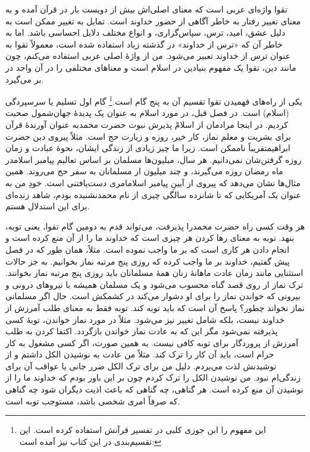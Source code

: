 تقوا واژه‌ای عربی است که معنای اصلی‌اش بیش از دویست بار در قرآن آمده و به معنای تغییر رفتار به خاطر آگاهی از حضور خداوند است. تمایل به تغییر ممکن است به دلیل عشق، امید، ترس، سپاس‌گزاری، و انواع مختلف دلایل احساسی باشد. اما به خاطر آن که «ترس از خداوند» در گذشته زیاد استفاده شده است، معمولاً تقوا به عنوان ترس از خداوند تعبیر می‌شود. من از واژهٔ اصلی عربی استفاده می‌کنم، چون مانند دین، تقوا یک مفهوم بنیادین در اسلام است و معناهای مختلفی را در آن واحد در بر می‌گیرد.

یکی از راه‌های فهمیدن تقوا تقسیم آن به پنج گام است.\footnote{این مفهوم را ابن جوزی کلبی در تفسیر قرآنش استفاده کرده است. این تقسیم‌بندی در این کتاب نیز آمده است:
	
	}
گام اول تسلیم یا سرسپردگی (اسلام) است. در فصل قبل، در مورد اسلام به عنوان یک پدیدهٔ جهان‌شمول صحبت کردیم. در اینجا مرادمان از اسلامْ پذیرش نبوت حضرت محمد{}به عنوان آورندهٔ قرآن برای بشریت و معلم نماز، کار خیر، روزه و زیارت حج است. مثلاً پیروی دین حضرت ابراهیم{}تقریباً ناممکن است. زیرا ما چیز زیادی از زندگی ایشان، نحوهٔ عبادت و زمان روزه گرفتن‌شان نمی‌دانیم. هر سال، میلیون‌ها مسلمان بر اساس تعالیم پیامبر اسلام{}در ماه رمضان روزه می‌گیرند، و چند میلیون از مسلمانان به سفر حج می‌روند. همین مثال‌ها نشان می‌دهد که پیروی از آیینِ پیامبر اسلام{}امری دست‌یافتنی است. خودِ من به عنوان یک آمریکایی که تا شانزده سالگی چیزی از نام محمد{}نشنیده بودم، شاهد زنده‌ای برای این استدلال هستم.

هر وقت کسی راه حضرت محمد{}را پذیرفت، می‌تواند قدم به دومین گام تقوا، یعنی توبه، بنهد. توبه به معنای رها کردن هر چیزی است که خداوند ما را از آن منع کرده است و انجام دادن هر کاری است که بر ما واجب نموده است. مثلاً، همان طور که در فصل پیش گفتیم، خداوند بر ما واجب کرده که روزی پنج مرتبه نماز بخوانیم. به جز حالات استثنایی مانند زمان عادت ماهانهٔ زنان همهٔ مسلمانان باید روزی پنج مرتبه نماز بخوانند. ترک نماز از روی قصد گناه محسوب می‌شود و یک مسلمان همیشه با نیروهای درونی و بیرونی که خواندن نماز را برای او دشوار می‌کند در کشمکش است. حال اگر مسلمانی نماز نخواند چطور؟ پاسخ آن است که باید توبه کند. توبه فقط به معنای طلب آمرزش از خداوند نیست، بلکه شامل تغییر نیز می‌شود. مثلاً در مورد نماز خواندن، توبهٔ کسی پذیرفته نمی‌شود مگر این که به عادت نماز خواندن بازگردد. اکتفا کردن به طلب آمرزش از پروردگار برای توبه کافی نیست. به همین صورت، اگر کسی مشغول به کار حرام است، باید آن کار را ترک کند. مثلاً من عادت به نوشیدن الکل داشتم و از نوشیدنش لذت می‌بردم. دلیل من برای ترک الکل ضرر جانی یا عواقب آن برای زندگی‌ام نبود. من نوشیدن الکل را ترک کردم چون بر این باور بودم که خداوند ما را از نوشیدن آن منع کرده است. هر گناهی، چه گناهی که باعث اذیت دیگران شود چه گناهی که صرفاً امری شخصی باشد، مستوجب توبه است.

